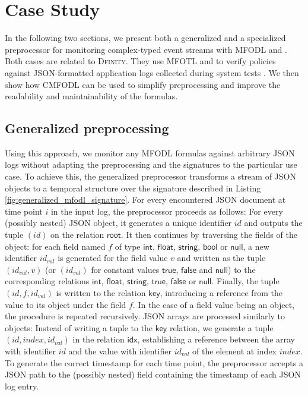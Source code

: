 \chapter{Case Study}
\label{chap:case_study}

In the following two sections, we present both a generalized and a specialized preprocessor for monitoring complex-typed event streams with MFODL and \MonPolyN. Both cases are related to \textsc{Dfinity}. They use MFOTL and \MonPoly to verify policies against JSON-formatted application logs collected during system tests \cite{IcPolicymonitoringMaster}. We then show how CMFODL can be used to simplify preprocessing and improve the readability and maintainability of the formulas.

\section{Generalized preprocessing}
Using this approach, we monitor any MFODL formulas against arbitrary JSON logs without adapting the preprocessing and the signatures to the particular use case. To achieve this, the generalized preprocessor transforms a stream of JSON objects to a temporal structure over the signature described in Listing \ref{fig:generalized_mfodl_signature}. For every encountered JSON document at time point $i$ in the input log, the preprocessor proceeds as follows: For every (possibly nested) JSON object, it generates a unique identifier $id$ and outputs the tuple $(id)$ on the relation $\mathsf{root}$. It then continues by traversing the fields of the object: for each field named $f$ of type $\mathsf{int}$, $\mathsf{float}$, $\mathsf{string}$, $\mathsf{bool}$ or $\mathsf{null}$, a new identifier $id_{val}$ is generated for the field value $v$ and written as the tuple $(id_{val}, v)$ (or $(id_{val})$ for constant values $\mathsf{true}$, $\mathsf{false}$ and $\mathsf{null}$) to the corresponding relations $\mathsf{int}$, $\mathsf{float}$, $\mathsf{string}$, $\mathsf{true}$, $\mathsf{false}$ or $\mathsf{null}$. Finally, the tuple $(id, f, id_{val})$ is written to the relation $\mathsf{key}$, introducing a reference from the value to its object under the field $f$. In the case of a field value being an object, the procedure is repeated recursively. JSON arrays are processed similarly to objects: Instead of writing a tuple to the $\mathsf{key}$ relation, we generate a tuple $(id, index, id_{val})$ in the relation $\mathsf{idx}$, establishing a reference between the array with identifier $id$ and the value with identifier $id_{val}$ of the element at index $index$. To generate the correct timestamp for each time point, the preprocessor accepts a JSON path to the (possibly nested) field containing the timestamp of each JSON log entry.


